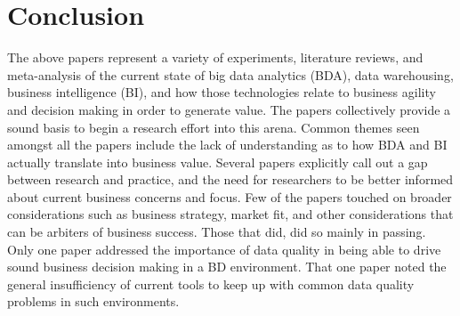 \section{Conclusion}

The above papers represent a variety of experiments, literature reviews, and meta-analysis of the current state of big data analytics (BDA), data warehousing, business intelligence (BI), and how those technologies relate to business agility and decision making in order to generate value. The papers collectively provide a sound basis to begin a research effort into this arena. Common themes seen amongst all the papers include the lack of understanding as to how BDA and BI actually translate into business value. Several papers explicitly call out a gap between research and practice, and the need for researchers to be better informed about current business concerns and focus. Few of the papers touched on broader considerations such as business strategy, market fit, and other considerations that can be arbiters of business success. Those that did, did so mainly in passing. Only one paper addressed the importance of data quality in being able to drive sound business decision making in a BD environment. That one paper noted the general insufficiency of current tools to keep up with common data quality problems in such environments.

